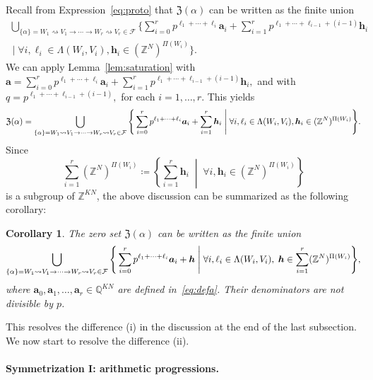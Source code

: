 \documentclass[letterpaper, 11pt, thm-restate]{article}
\numberwithin{equation}{section}
\newcommand{\Z}{\mathbb{Z}}
\newcommand{\Q}{\mathbb{Q}}
\newcommand{\mF}{\mathcal{F}}
\newcommand{\mZ}{\mathfrak{Z}}
\newcommand{\ba}{\boldsymbol{a}}
\newcommand{\bh}{\boldsymbol{h}}
\newtheorem{cor}[thrm]{Corollary}
\theoremstyle{definition}
\theoremstyle{definition}
\theoremstyle{definition}
\begin{document}
Recall from Expression~\eqref{eq:proto} that $\mZ(\alpha)$ can be written as the finite union
\begin{multline*}
\bigcup_{\{\alpha\} = W_1 \rightsquigarrow V_1 \rightarrow \cdots \rightarrow W_r \rightsquigarrow V_r \in \mF} \Bigg\{\sum_{i = 0}^r p^{\ell_1 + \cdots + \ell_{i}} \ba_i + \sum_{i = 1}^r p^{\ell_1 + \cdots + \ell_{i-1} + (i-1)} \bh_i \\
        \;\Bigg|\; \forall i, \ell_i \in \Lambda(W_i, V_i), \bh_i \in (\Z^N)^{\Pi(W_i)} \Bigg\}.
\end{multline*}
We can apply Lemma~\ref{lem:saturation} with
$
\ba = \sum_{i = 0}^r p^{\ell_1 + \cdots + \ell_{i}} \ba_i + \sum_{i = 1}^r p^{\ell_1 + \cdots + \ell_{i-1} + (i-1)} \bh_i,
$
and with
$
q = p^{\ell_1 + \cdots + \ell_{i-1} + (i-1)},
$
for each $i = 1, \ldots, r$.
This yields
\[
\mZ(\alpha) = \bigcup_{\{\alpha\} = W_1 \rightsquigarrow V_1 \rightarrow \cdots \rightarrow W_r \rightsquigarrow V_r \in \mF} \Bigg\{\sum_{i = 0}^r p^{\ell_1 + \cdots + \ell_{i}} \ba_i + \sum_{i = 1}^r \bh_i \\
        \;\Bigg|\; \forall i, \ell_i \in \Lambda(W_i, V_i), \bh_i \in (\Z^N)^{\Pi(W_i)} \Bigg\}.
\]
Since
\[
    \sum_{i = 1}^r (\Z^N)^{\Pi(W_i)} \coloneqq \left\{\sum_{i = 1}^r \bh_i \;\middle|\; \forall i, \bh_i \in (\Z^N)^{\Pi(W_i)} \right\}
\]
is a subgroup of $\Z^{KN}$, the above discussion can be summarized as the following corollary:

\begin{cor}\label{cor:saturated}
    The zero set $\mZ(\alpha)$ can be written as the finite union
    \begin{equation}\label{eq:saturated}
        \bigcup_{\{\alpha\} = W_1 \rightsquigarrow V_1 \rightarrow \cdots \rightarrow W_r \rightsquigarrow V_r \in \mF} \Bigg\{\sum_{i = 0}^r p^{\ell_1 + \cdots + \ell_{i}} \ba_i + \bh \\
        \;\Bigg|\; \forall i, \ell_i \in \Lambda(W_i, V_i),\; \bh \in \sum_{i = 1}^r (\Z^N)^{\Pi(W_i)} \Bigg\},
    \end{equation}
    where $\ba_0, \ba_1, \ldots, \ba_r \in \Q^{KN}$ are defined in~\eqref{eq:defa}. Their denominators are not divisible by $p$.
\end{cor}

This resolves the difference (i) in the discussion at the end of the last subsection.
We now start to resolve the difference (ii).

\paragraph{Symmetrization I: arithmetic progressions.}
\end{document}
